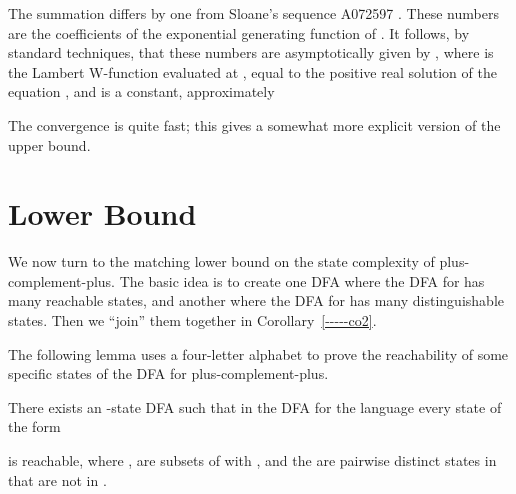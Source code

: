 \documentclass[runningheads]{llncs}
\begin{document}
\begin{remark}
The summation  differs by
one from Sloane's sequence A072597 \cite{Sloane}.  These numbers are the
coefficients of the exponential generating function of
.  It follows, by standard techniques, that
these numbers are asymptotically given by
,
where
 is the
Lambert W-function evaluated at , equal to the positive real
solution of the equation , and  is a constant,
approximately 

The convergence
is quite fast; this gives a somewhat more explicit version of the
upper bound.
\end{remark}

\section{Lower Bound}
\label{***lower}

We now turn to the matching lower bound on the state complexity
of plus-complement-plus.  The basic idea is to create one DFA
where the DFA for  has many reachable states, and another
where the DFA for  has many distinguishable states.
Then we ``join'' them together in Corollary~\ref{-----co2}.

The following lemma uses a four-letter alphabet 
to prove the reachability of some specific states
of the DFA  for plus-complement-plus.

\begin{lemma}\label{-----le3}\label{le:reach}
 There exists an -state
 DFA  
 such that in the  DFA  for the language 
 every state of the form
 
 is reachable, 
 where , 
  are subsets of  with
 , and the
  are pairwise distinct states in 
 that are not in .
\end{lemma}
\end{document}
